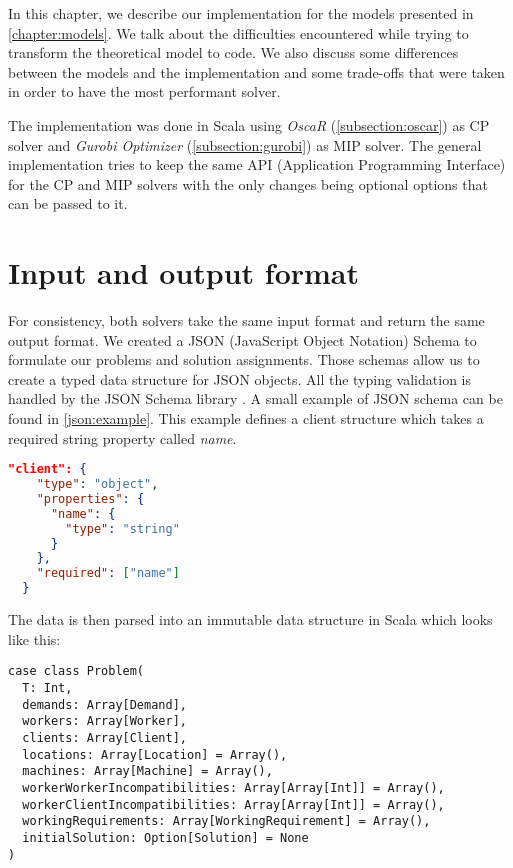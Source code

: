 \documentclass[../thesis.tex]{subfiles}
\begin{document}
In this chapter, we describe our implementation for the models presented in \autoref{chapter:models}. 
We talk about the difficulties encountered while trying to transform the theoretical model to code. 
We also discuss some differences between the models and the implementation and some trade-offs that were taken in order to 
have the most performant solver.

The implementation was done in Scala using 
\emph{OscaR} (\ref{subsection:oscar}) as CP solver and
\emph{Gurobi Optimizer} (\ref{subsection:gurobi}) as MIP solver. The general implementation 
tries to keep the same API (Application Programming Interface) for the CP and MIP solvers with the only changes being optional options 
that can be passed to it. 



\section{Input and output format}

For consistency, both solvers take the same input format and return the same output format.
We created a JSON (JavaScript Object Notation) Schema \cite{json:schema} to formulate our problems and solution assignments.
Those schemas allow us to create a typed data structure for JSON objects. All the typing validation 
is handled by the JSON Schema library \cite{playjson:validator}. A small example of JSON schema can be found in \autoref{json:example}. 
This example defines a client structure which takes a required string property called \textit{name}.


\begin{lstlisting}[language=json,firstnumber=1,caption={JSON Schema example},captionpos=b,label={json:example}]
  "client": {
    "type": "object",
    "properties": {
      "name": {
        "type": "string"
      }
    },
    "required": ["name"]
  }
\end{lstlisting}

The data is then parsed into an immutable data structure in Scala which looks like this:

\begin{lstlisting}[style=scalaStyle,caption={Problem structure in Scala},captionpos=b]
case class Problem(
  T: Int,
  demands: Array[Demand],
  workers: Array[Worker],
  clients: Array[Client],
  locations: Array[Location] = Array(),
  machines: Array[Machine] = Array(),
  workerWorkerIncompatibilities: Array[Array[Int]] = Array(),
  workerClientIncompatibilities: Array[Array[Int]] = Array(),
  workingRequirements: Array[WorkingRequirement] = Array(),
  initialSolution: Option[Solution] = None
)
\end{lstlisting}
\end{document}
